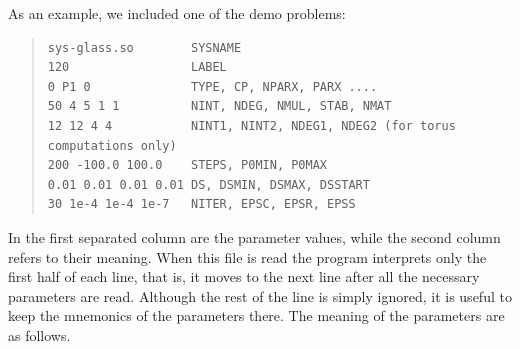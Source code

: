 \documentclass[10pt,a4paper]{ddedoc}
\begin{document}
As an example, we included one of the demo problems:
{ \small \begin{quote} \begin{lstlisting}[basicstyle=\tt,frame=single]
sys-glass.so        SYSNAME
120                 LABEL
0 P1 0              TYPE, CP, NPARX, PARX ....
50 4 5 1 1          NINT, NDEG, NMUL, STAB, NMAT
12 12 4 4           NINT1, NINT2, NDEG1, NDEG2 (for torus computations only)
200 -100.0 100.0    STEPS, P0MIN, P0MAX
0.01 0.01 0.01 0.01 DS, DSMIN, DSMAX, DSSTART
30 1e-4 1e-4 1e-7   NITER, EPSC, EPSR, EPSS
\end{lstlisting} \end{quote} } \noindent
In the first separated column are the parameter values, while the second column refers to their meaning. 
When this file is read the program interprets only the first half of each line, that is, it moves to the next line
after all the necessary parameters are read. Although the rest of the line is simply ignored, 
it is useful to keep the mnemonics of the parameters there. The meaning of the parameters are as
follows.
\end{document}
